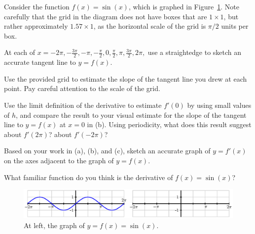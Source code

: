 


\begin{activity} \label{A:2.4.7}  Consider the function $f(x) = \sin(x)$, which is graphed in Figure~\ref{F:2.4.A7}.  Note carefully that the grid in the diagram does not have boxes that are $1 \times 1$, but rather approximately $1.57 \times 1$, as the horizontal scale of the grid is $\pi/2$ units per box.
\ba
	\item At each of $x = -2\pi, -\frac{3\pi}{2}, -\pi, -\frac{\pi}{2}, 0, \frac{\pi}{2}, \pi, \frac{3\pi}{2}, 2\pi,$ use a straightedge to sketch an accurate tangent line to $y = f(x)$.
	\item Use the provided grid to estimate the slope of the tangent line you drew at each point.  Pay careful attention to the scale of the grid.
	\item Use the limit definition of the derivative to estimate $f'(0)$ by using small values of $h$, and compare the result to your visual estimate for the slope of the tangent line to $y = f(x)$ at $x = 0$ in (b).  Using periodicity, what does this result suggest about $f'(2\pi)$?  about $f'(-2\pi)$?  
	\item Based on your work in (a), (b), and (c), sketch an accurate graph of $y = f'(x)$ on the axes adjacent to the graph of $y = f(x)$.
	\item What familiar function do you think is the derivative of $f(x) = \sin(x)$?
\ea
\end{activity}

\vspace{-1cm}

\begin{figure} %
\begin{flushleft}
\includegraphics{figures/2_2_sine.eps}
\caption{At left, the graph of $y = f(x) = \sin(x)$.} \label{F:2.4.A7}
\end{flushleft}
\end{figure}

